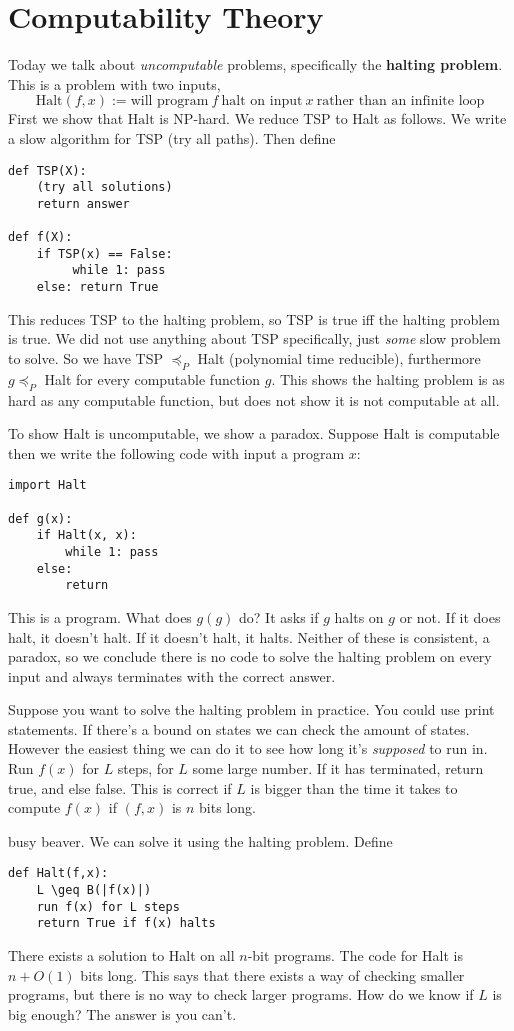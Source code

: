 \section{Computability Theory} 
Today we talk about \emph{uncomputable} problems, specifically the \textbf{halting problem}.  This is a problem with two inputs, \[
    \mathrm{Halt}(f,x):= \text{will program} \ f \ \text{halt on input} \ x \ \text{rather than an infinite loop} 
\] First we show that $\mathrm{Halt}$ is NP-hard. We reduce TSP to  Halt as follows. We write a slow algorithm for TSP (try all paths). Then define 
\begin{verbatim}
def TSP(X):
    (try all solutions)
    return answer

def f(X):
    if TSP(x) == False:
         while 1: pass
    else: return True
\end{verbatim}
This reduces TSP to the halting problem, so TSP is true iff the halting problem is true. We did not use anything about TSP specifically, just \emph{some} slow problem to solve. So we have TSP $\preccurlyeq_P$ Halt (polynomial time reducible),  furthermore $g \preccurlyeq_P$ Halt for every computable function  $g$. This shows the halting problem is as hard as any computable function, but does not show it is not computable at all.

To show Halt is uncomputable, we show a paradox. Suppose Halt is computable then we write the following code with input a program $x$:
\begin{verbatim}
import Halt

def g(x):
    if Halt(x, x):
        while 1: pass
    else:
        return
\end{verbatim}
This is a program. What does $g(g)$ do? It asks if $g$ halts on $g$ or not. If it does halt, it doesn't halt. If it doesn't halt, it halts. Neither of these is consistent, a paradox, so we conclude there is no code to solve the halting problem on every input and always terminates with the correct answer.

Suppose you want to solve the halting problem in practice. You could use print statements. If there's a bound on states we can check the amount of states. However the easiest thing we can do it to see how long it's \emph{supposed} to run in. Run $f(x)$ for $L$ steps, for $L$ some large number. If it has terminated, return true, and else false. This is correct if $L$ is bigger than the time it takes to compute $f(x)$ if $(f,x)$ is $n$ bits long.

busy beaver. We can solve it using the halting problem. Define 
\begin{verbatim}
def Halt(f,x):
    L \geq B(|f(x)|)
    run f(x) for L steps
    return True if f(x) halts
\end{verbatim}There exists a solution to Halt on all $n$-bit programs. The code for Halt is $n+O(1)$ bits long. This says that there exists a way of checking smaller programs, but there is no way to check larger programs. How do we know if $L$ is big enough? The answer is you can't.


